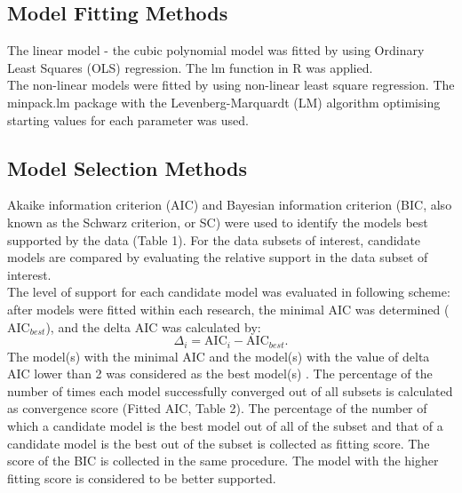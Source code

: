 \documentclass[a4paper,11pt]{article}
\theoremstyle{definition}
\begin{document}
\begin{linenumbers}
\subsection{Model Fitting Methods}
The linear model - the cubic polynomial model was fitted by using Ordinary Least Squares (OLS) regression. The lm function in R \citep{R} was applied.\\
The non-linear models were fitted by using non-linear least square regression. The minpack.lm package \citep{minpack} with the Levenberg-Marquardt (LM) algorithm optimising starting values for each parameter was used.
\subsection{Model Selection Methods}
Akaike information criterion (AIC) \citep{AIC} and Bayesian information criterion (BIC, also known as the Schwarz criterion, or SC) \citep{BIC} were used to identify the models best supported by the data (Table 1). For the data subsets of interest, candidate models are compared by evaluating the relative support in the data subset of interest.\\
The level of support for each candidate model was evaluated in following scheme: after models were fitted within each research, the minimal AIC was determined ($\text{AIC}_{best}$), and the delta AIC was calculated by:\[ \Delta_i = \text{AIC}_i - \text{AIC}_{best} .\] The model(s) with the minimal AIC and the model(s) with the value of delta AIC lower than 2 was considered as the best model(s) \citep{burnham2004multimodel}. The percentage of the number of times each model successfully converged out of all subsets is calculated as convergence score (Fitted AIC, Table 2). The percentage of the number of which a candidate model is the best model out of all of the subset and that of a candidate model is the best out of the subset is collected as fitting score. The score of the BIC is collected in the same procedure. The model with the higher fitting score is considered to be better supported.
\begin{center}
\begin{table}[]
\caption {Used model selection methods}
\begin{threeparttable}
\end{threeparttable}
\end{table}
\end{center}
\end{linenumbers}
\end{document}
